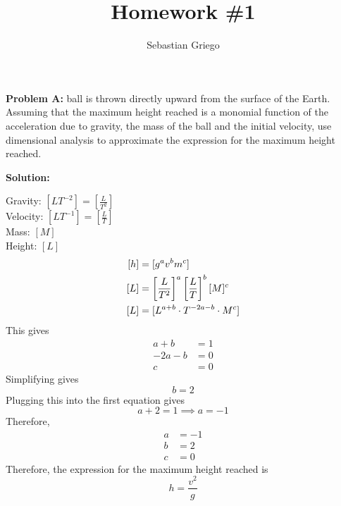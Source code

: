 \documentclass[12pt]{article}
\newenvironment{problem}[1]{
    \textbf{Problem #1:}
}{
    \rmfamily \vspace{1em}
}
\newenvironment{solution}{
    \textbf{Solution:}
    
}{
    
    \vspace{2em}
}
\begin{document}
\title{Homework \#1}  %
\author{Sebastian Griego}  %

\begin{problem}{1}
    A ball is thrown directly upward from the surface of the Earth. Assuming that the maximum height reached is a monomial function of the acceleration due to gravity, the mass of the ball and the initial velocity, use dimensional analysis to approximate the expression for the maximum height reached.
\end{problem}

\begin{solution}
    Gravity: \([LT^{-2}] = [\frac{L}{T^2}]\)\\
    Velocity: \([LT^{-1}] = [\frac{L}{T}]\)\\
    Mass: \([M]\)\\
    Height: \([L]\)\\
    \[
        \begin{aligned}\relax
            [h] &= [g^a v^b m^c] \\
            [L] &= \left[\frac{L}{T^2}\right]^a \left[\frac{L}{T}\right]^b [M]^c \\
            [L] &= [L^{a+b} \cdot T^{-2a-b} \cdot M^c] \\
        \end{aligned}
    \]
    This gives
    \[
        \begin{aligned}
            a+b &= 1 \\
            -2a-b &= 0 \\
            c &= 0
        \end{aligned}
    \]
    Simplifying gives
    \[
        b =2
    \]
    Plugging this into the first equation gives
    \[
        a + 2 = 1 \implies a = -1
    \]
    Therefore,
    \[
        \begin{aligned}
            a &= -1 \\
            b &= 2 \\
            c &= 0
        \end{aligned}
    \]
    Therefore, the expression for the maximum height reached is
    \[
        h = \frac{v^2}{g}
    \]
    


    
    
\end{solution}
\end{document}
